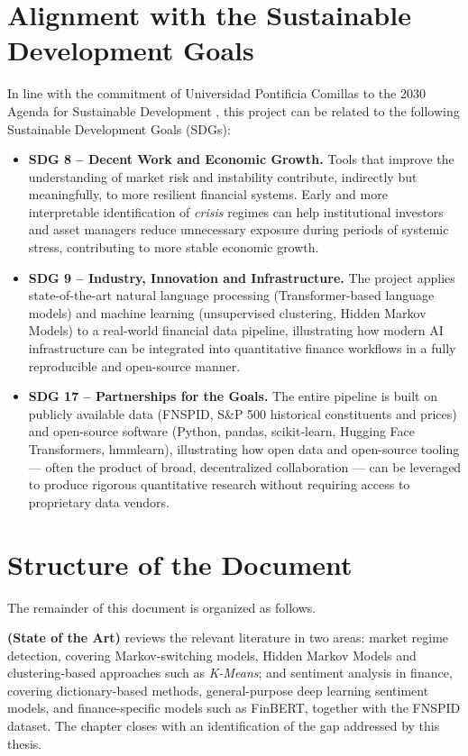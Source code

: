 \section{Alignment with the Sustainable Development Goals}
\label{sec:sdgs}

In line with the commitment of Universidad Pontificia Comillas to the
2030 Agenda for Sustainable Development \cite{un2015sdgs}, this project
can be related to the following Sustainable Development Goals (SDGs):

\begin{itemize}
  \item \textbf{SDG 8 -- Decent Work and Economic Growth.} Tools that
  improve the understanding of market risk and instability contribute,
  indirectly but meaningfully, to more resilient financial systems. Early
  and more interpretable identification of \emph{crisis} regimes can help
  institutional investors and asset managers reduce unnecessary exposure
  during periods of systemic stress, contributing to more stable economic
  growth.
  \item \textbf{SDG 9 -- Industry, Innovation and Infrastructure.} The
  project applies state-of-the-art natural language processing
  (Transformer-based language models) and machine learning (unsupervised
  clustering, Hidden Markov Models) to a real-world financial data
  pipeline, illustrating how modern AI infrastructure can be integrated
  into quantitative finance workflows in a fully reproducible and
  open-source manner.
  \item \textbf{SDG 17 -- Partnerships for the Goals.} The entire pipeline
  is built on publicly available data (FNSPID, S\&P 500 historical
  constituents and prices) and open-source software (Python, pandas,
  scikit-learn, Hugging Face Transformers, hmmlearn), illustrating how
  open data and open-source tooling --- often the product of broad,
  decentralized collaboration --- can be leveraged to produce rigorous
  quantitative research without requiring access to proprietary data
  vendors.
\end{itemize}

\section{Structure of the Document}
\label{sec:structure}

The remainder of this document is organized as follows.

\textbf{ (State of the Art)} reviews the relevant literature
in two areas: market regime detection, covering Markov-switching models,
Hidden Markov Models and clustering-based approaches such as
\textit{K-Means}; and sentiment analysis in finance, covering
dictionary-based methods, general-purpose deep learning sentiment models,
and finance-specific models such as FinBERT, together with the FNSPID
dataset. The chapter closes with an identification of the gap addressed
by this thesis.

